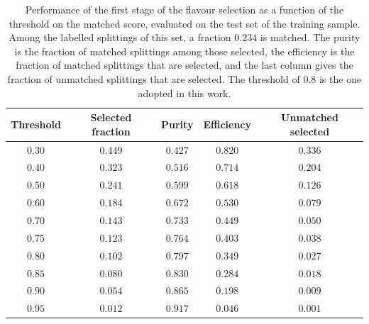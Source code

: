 \begin{table}[htbp]
  \centering
  \caption{Performance of the first stage of the flavour selection as a function of
  the threshold on the matched score, evaluated on the test set of the training
  sample. Among the labelled splittings of this set, a fraction $0.234$ is matched.
  The purity is the fraction of matched splittings among those selected, the
  efficiency is the fraction of matched splittings that are selected, and the last
  column gives the fraction of unmatched splittings that are selected. The
  threshold of $0.8$ is the one adopted in this work.}
  \label{tab:stage1-scan}
  \begin{tabular}{ccccc}
    \toprule
    Threshold & Selected fraction & Purity & Efficiency & Unmatched selected \\
    \midrule
    $0.30$ & $0.449$ & $0.427$ & $0.820$ & $0.336$ \\
    $0.40$ & $0.323$ & $0.516$ & $0.714$ & $0.204$ \\
    $0.50$ & $0.241$ & $0.599$ & $0.618$ & $0.126$ \\
    $0.60$ & $0.184$ & $0.672$ & $0.530$ & $0.079$ \\
    $0.70$ & $0.143$ & $0.733$ & $0.449$ & $0.050$ \\
    $0.75$ & $0.123$ & $0.764$ & $0.403$ & $0.038$ \\
    $\mathbf{0.80}$ & $\mathbf{0.102}$ & $\mathbf{0.797}$ & $\mathbf{0.349}$ & $\mathbf{0.027}$ \\
    $0.85$ & $0.080$ & $0.830$ & $0.284$ & $0.018$ \\
    $0.90$ & $0.054$ & $0.865$ & $0.198$ & $0.009$ \\
    $0.95$ & $0.012$ & $0.917$ & $0.046$ & $0.001$ \\
    \bottomrule
  \end{tabular}
\end{table}

